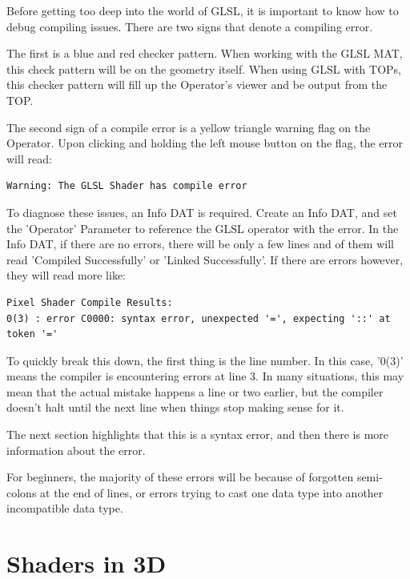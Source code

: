 \begin{fullwidth}
Before getting too deep into the world of GLSL, it is important to know how to debug compiling issues. There are two signs that denote a compiling error. 

The first is a blue and red checker pattern. When working with the GLSL MAT, this check pattern will be on the geometry itself. When using GLSL with TOPs, this checker pattern will fill up the Operator's viewer and be output from the TOP.

The second sign of a compile error is a yellow triangle warning flag on the Operator. Upon clicking and holding the left mouse button on the flag, the error will read: 

\begin{lstlisting}
Warning: The GLSL Shader has compile error
\end{lstlisting}

To diagnose these issues, an Info DAT is required. Create an Info DAT, and set the 'Operator' Parameter to reference the GLSL operator with the error. In the Info DAT, if there are no errors, there will be only a few lines and of them will read 'Compiled Successfully' or 'Linked Successfully'. If there are errors however, they will read more like:

\begin{lstlisting}
Pixel Shader Compile Results:
0(3) : error C0000: syntax error, unexpected '=', expecting '::' at token '='
\end{lstlisting}

To quickly break this down, the first thing is the line number. In this case, '0(3)' means the compiler is encountering errors at line 3. In many situations, this may mean that the actual mistake happens a line or two earlier, but the compiler doesn't halt until the next line when things stop making sense for it. 

The next section highlights that this is a syntax error, and then there is more information about the error. 

For beginners, the majority of these errors will be because of forgotten semi-colons at the end of lines, or errors trying to cast one data type into another incompatible data type.


\end{fullwidth}


\section{Shaders in 3D}


